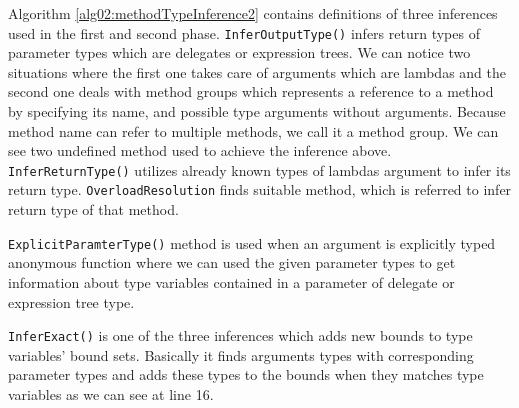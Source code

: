 \par
{}
Algorithm \ref{alg02:methodTypeInference2} contains definitions of three inferences used in the first and second phase.
\texttt{InferOutputType()} infers return types of parameter types which are delegates or expression trees.
We can notice two situations where the first one takes care of arguments which are lambdas and the second one deals with method groups which represents a reference to a method by specifying its name, and possible type arguments without arguments.
Because method name can refer to multiple methods, we call it a method group.
We can see two undefined method used to achieve the inference above.
\texttt{InferReturnType()} utilizes already known types of lambdas argument to infer its return type.
\texttt{OverloadResolution} finds suitable method, which is referred to infer return type of that method. 
\par
{}
\texttt{ExplicitParamterType()} method is used when an argument is explicitly typed anonymous function where we can used the given parameter types to get information about type variables contained in a parameter of delegate or expression tree type.
\par
{}
\texttt{InferExact()} is one of the three inferences which adds new bounds to type variables' bound sets.
Basically it finds arguments types with corresponding parameter types and adds these types to the bounds when they matches type variables as we can see at line 16.
\par
